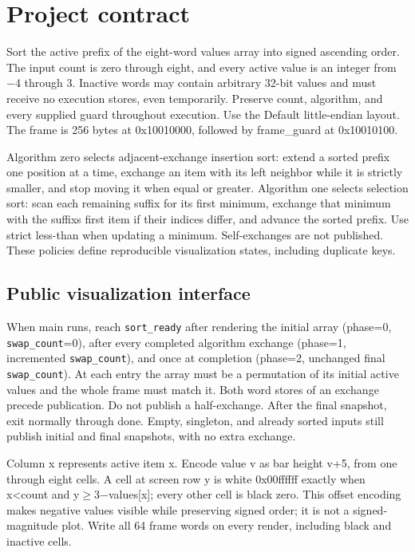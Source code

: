\section{Project contract}\label{009-sorting-visualizer-assignment-visualize-insertion-and-selection-sort}

Sort the active prefix of the eight-word values array into signed
ascending order. The input count is zero through eight, and every active
value is an integer from \ensuremath{-}4 through 3. Inactive words may contain
arbitrary 32-bit values and must receive no execution stores, even
temporarily. Preserve count, algorithm, and every supplied guard
throughout execution. Use the Default little-endian layout. The frame is
256 bytes at 0x10010000, followed by frame\_guard at 0x10010100.

Algorithm zero selects adjacent-exchange insertion sort: extend a sorted
prefix one position at a time, exchange an item with its left neighbor
while it is strictly smaller, and stop moving it when equal or greater.
Algorithm one selects selection sort: scan each remaining suffix for its
first minimum, exchange that minimum with the suffix\textquotesingle s
first item if their indices differ, and advance the sorted prefix. Use
strict less-than when updating a minimum. Self-exchanges are not
published. These policies define reproducible visualization states,
including duplicate keys.

\subsection{Public visualization
  interface}\label{009-sorting-visualizer-assignment-public-visualization-interface}

When main runs, reach \texttt{sort\_ready} after rendering the initial
array (phase=0, \texttt{swap\_count}=0), after every completed algorithm
exchange (phase=1, incremented \texttt{swap\_count}), and once at
completion (phase=2, unchanged final \texttt{swap\_count}). At each
entry the array must be a permutation of its initial active values and
the whole frame must match it. Both word stores of an exchange precede
publication. Do not publish a half-exchange. After the final snapshot,
exit normally through done. Empty, singleton, and already sorted inputs
still publish initial and final snapshots, with no extra exchange.

Column x represents active item x. Encode value v as bar height v+5,
from one through eight cells. A cell at screen row y is white 0x00ffffff
exactly when x\textless count and y\ensuremath{\geq}3\ensuremath{-}values{[}x{]}; every other cell is
black zero. This offset encoding makes negative values visible while
preserving signed order; it is not a signed-magnitude plot. Write all 64
frame words on every render, including black and inactive cells.

